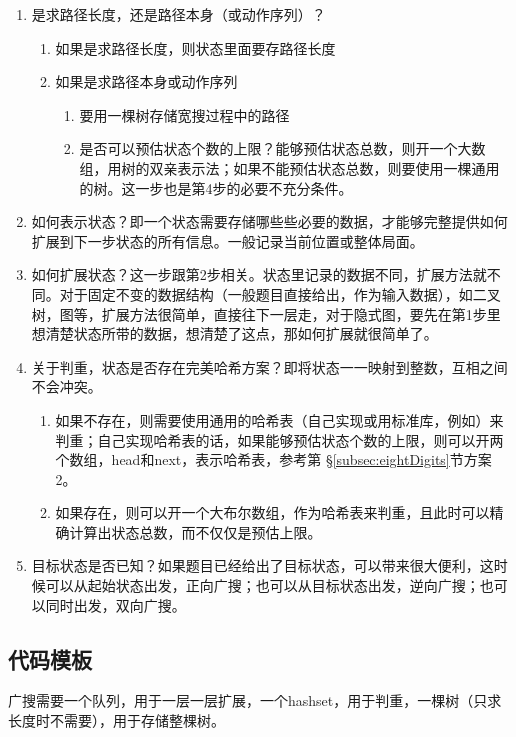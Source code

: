 \begin{enumerate}
\item 是求路径长度，还是路径本身（或动作序列）？
    \begin{enumerate}
    \item 如果是求路径长度，则状态里面要存路径长度
    \item 如果是求路径本身或动作序列
        \begin{enumerate}
            \item 要用一棵树存储宽搜过程中的路径
            \item 是否可以预估状态个数的上限？能够预估状态总数，则开一个大数组，用树的双亲表示法；如果不能预估状态总数，则要使用一棵通用的树。这一步也是第4步的必要不充分条件。
        \end{enumerate}
    \end{enumerate}

\item 如何表示状态？即一个状态需要存储哪些些必要的数据，才能够完整提供如何扩展到下一步状态的所有信息。一般记录当前位置或整体局面。

\item 如何扩展状态？这一步跟第2步相关。状态里记录的数据不同，扩展方法就不同。对于固定不变的数据结构（一般题目直接给出，作为输入数据），如二叉树，图等，扩展方法很简单，直接往下一层走，对于隐式图，要先在第1步里想清楚状态所带的数据，想清楚了这点，那如何扩展就很简单了。

\item 关于判重，状态是否存在完美哈希方案？即将状态一一映射到整数，互相之间不会冲突。
    \begin{enumerate}
    \item 如果不存在，则需要使用通用的哈希表（自己实现或用标准库，例如）来判重；自己实现哈希表的话，如果能够预估状态个数的上限，则可以开两个数组，head和next，表示哈希表，参考第 \S \ref{subsec:eightDigits}节方案2。
    \item 如果存在，则可以开一个大布尔数组，作为哈希表来判重，且此时可以精确计算出状态总数，而不仅仅是预估上限。
    \end{enumerate}

\item 目标状态是否已知？如果题目已经给出了目标状态，可以带来很大便利，这时候可以从起始状态出发，正向广搜；也可以从目标状态出发，逆向广搜；也可以同时出发，双向广搜。
\end{enumerate}


\subsection{代码模板}
广搜需要一个队列，用于一层一层扩展，一个hashset，用于判重，一棵树（只求长度时不需要），用于存储整棵树。

